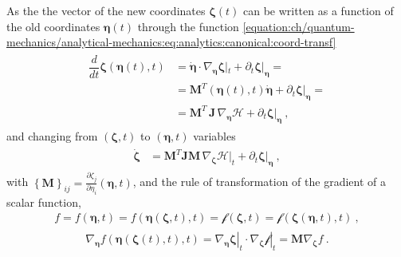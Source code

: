 \documentclass[letterpaper,10pt,english]{jupyterBook}
\begin{document}
\sphinxAtStartPar
{} As the the vector of the new coordinates \(\boldsymbol\zeta(t)\) can be written as a function of the old coordinates \(\boldsymbol\eta(t)\) through the function \eqref{equation:ch/quantum-mechanics/analytical-mechanics:eq:analytics:canonical:coord-transf}
\begin{equation*}
\begin{split}\begin{aligned}
 \dfrac{d}{dt} \boldsymbol{\zeta} \left(\boldsymbol\eta(t), t\right)
 & = \dot{\boldsymbol\eta} \cdot \nabla_{\boldsymbol\eta} \boldsymbol\zeta|_t + \partial_t \boldsymbol\zeta|_{\boldsymbol\eta} = \\
 & = \mathbf{M}^T(\boldsymbol\eta(t), t) \dot{\boldsymbol\eta} + \partial_t \boldsymbol\zeta|_{\boldsymbol\eta} = \\
 & = \mathbf{M}^T \, \mathbf{J} \, \nabla_{\boldsymbol\eta} \mathcal{H} + \partial_t \boldsymbol\zeta|_{\boldsymbol\eta} \ ,
\end{aligned}\end{split}
\end{equation*}
\sphinxAtStartPar
and changing from \((\boldsymbol\zeta, t)\) to \((\boldsymbol\eta, t)\) variables
\begin{equation}\label{equation:ch/quantum-mechanics/analytical-mechanics:eq:analytics:canonical:coord-transf-zeta}
\begin{split}\begin{aligned}
 \dot{\boldsymbol{\zeta}}
 & = \mathbf{M}^T \mathbf{J} \mathbf{M} \, \nabla_{\boldsymbol\zeta} \left.\mathcal{H}\right|_t + \partial_t \boldsymbol\zeta|_{\boldsymbol\eta} \ ,
\end{aligned}\end{split}
\end{equation}
\sphinxAtStartPar
with \(\left\{ \mathbf{M} \right\}_{ij} = \frac{\partial \zeta_j}{\partial \eta_i}(\boldsymbol\eta, t)\), and the rule of transformation of the gradient of a scalar function,
\begin{equation*}
\begin{split}f = f( \boldsymbol\eta, t) = f( \boldsymbol\eta(\boldsymbol\zeta, t), t) = \mathscr{f}( \boldsymbol\zeta, t) = \mathscr{f}( \boldsymbol\zeta( \boldsymbol\eta, t), t) \ ,\end{split}
\end{equation*}\begin{equation*}
\begin{split}\begin{aligned}
  \nabla_{\boldsymbol\eta} f(\boldsymbol\eta(\boldsymbol\zeta(t), t), t) = \left.\nabla_{\boldsymbol\eta} \boldsymbol\zeta\right|_t \cdot \left.\nabla_{\boldsymbol\zeta} \mathscr{f} \right|_t = \mathbf{M} \nabla_{\boldsymbol\zeta} f \ .
\end{aligned}\end{split}
\end{equation*}
\end{document}
